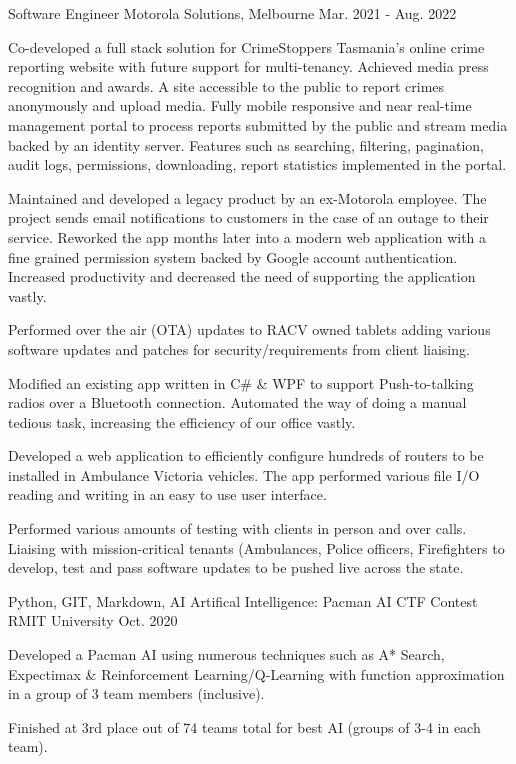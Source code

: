 \begin{cventries}
    {Software Engineer}
    {Motorola Solutions, Melbourne}
    {Mar. 2021 - Aug. 2022}
    {
      \begin{cvitems}
        \item {Co-developed a full stack solution for CrimeStoppers Tasmania's online crime reporting website with future support for multi-tenancy. Achieved media press recognition and awards. A site accessible to the public to report crimes anonymously and upload media. Fully mobile responsive and near real-time management portal to process reports submitted by the public and stream media backed by an identity server. Features such as searching, filtering, pagination, audit logs, permissions, downloading, report statistics implemented in the portal.}
		\item {Maintained and developed a legacy product by an ex-Motorola employee. The project sends email notifications to customers in the case of an outage to their service. Reworked the app months later into a modern web application with a fine grained permission system backed by Google account authentication. Increased productivity and decreased the need of supporting the application vastly.}
        \item {Performed over the air (OTA) updates to RACV owned tablets adding various software updates and patches for security/requirements from client liaising.}
		\item {Modified an existing app written in C\# \& WPF to support Push-to-talking radios over a Bluetooth connection. Automated the way of doing a manual tedious task, increasing the efficiency of our office vastly.}
        \item {Developed a web application to efficiently configure hundreds of routers to be installed in Ambulance Victoria vehicles. The app performed various file I/O reading and writing in an easy to use user interface.}
        \item {Performed various amounts of testing with clients in person and over calls. Liaising with mission-critical tenants (Ambulances, Police officers, Firefighters} to develop, test and pass software updates to be pushed live across the state.
      \end{cvitems}
    }
  \cventry
    {Python, GIT, Markdown, AI}
    {Artifical Intelligence: Pacman AI CTF Contest}
    {RMIT University}
    {Oct. 2020}
    {
      \begin{cvitems}
        \item {Developed a Pacman AI using numerous techniques such as A* Search, Expectimax \& Reinforcement Learning/Q-Learning with function approximation in a group of 3 team members (inclusive).}
        \item {Finished at 3rd place out of 74 teams total for best AI (groups of 3-4 in each team).}
      \end{cvitems}
    }
\end{cventries}
